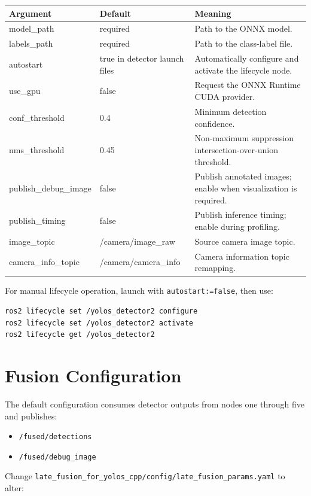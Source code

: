 \documentclass[11pt,a4paper]{article}
\begin{document}
\begin{longtable}{>{\ttfamily}p{} p{} p{}}
\toprule
\normalfont\textbf{Argument} & \textbf{Default} & \textbf{Meaning} \\
\midrule
\endhead
model\_path & required & Path to the ONNX model. \\
labels\_path & required & Path to the class-label file. \\
autostart & true in detector launch files & Automatically configure and activate the lifecycle node. \\
use\_gpu & false & Request the ONNX Runtime CUDA provider. \\
conf\_threshold & 0.4 & Minimum detection confidence. \\
nms\_threshold & 0.45 & Non-maximum suppression intersection-over-union threshold. \\
publish\_debug\_image & false & Publish annotated images; enable when visualization is required. \\
publish\_timing & false & Publish inference timing; enable during profiling. \\
image\_topic & /camera/image\_raw & Source camera image topic. \\
camera\_info\_topic & /camera/camera\_info & Camera information topic remapping. \\
\bottomrule
\end{longtable}

For manual lifecycle operation, launch with \texttt{autostart:=false}, then use:

\begin{lstlisting}
ros2 lifecycle set /yolos_detector2 configure
ros2 lifecycle set /yolos_detector2 activate
ros2 lifecycle get /yolos_detector2
\end{lstlisting}

\section{Fusion Configuration}

The default configuration consumes detector outputs from nodes one through five and publishes:

\begin{itemize}
  \item \texttt{/fused/detections}
  \item \texttt{/fused/debug\_image}
\end{itemize}

Change \texttt{late\_fusion\_for\_yolos\_cpp/config/late\_fusion\_params.yaml} to alter:
\end{document}
